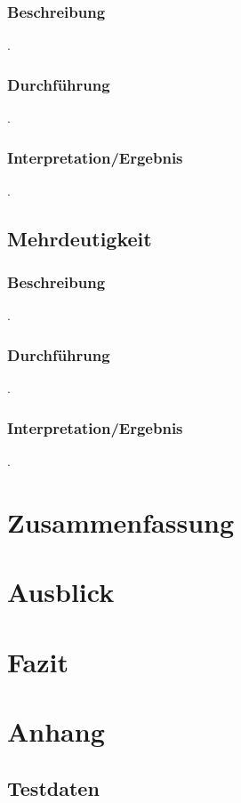 \documentclass[12pt,a4paper]{article}
\begin{document}
		\subsubsection{Beschreibung}
		.
		\subsubsection{Durchführung}
		.
		\subsubsection{Interpretation/Ergebnis}
		.
	\subsection{Mehrdeutigkeit}
		\subsubsection{Beschreibung}
		.
		\subsubsection{Durchführung}
		.
		\subsubsection{Interpretation/Ergebnis}
		.
		

\newpage
\section{Zusammenfassung}
\newpage
\section{Ausblick}
\newpage
\section{Fazit}
\newpage
\section{Anhang}
	\subsection{Testdaten}
	\label{sec:Testdaten}
	

	
	
\end{document}
